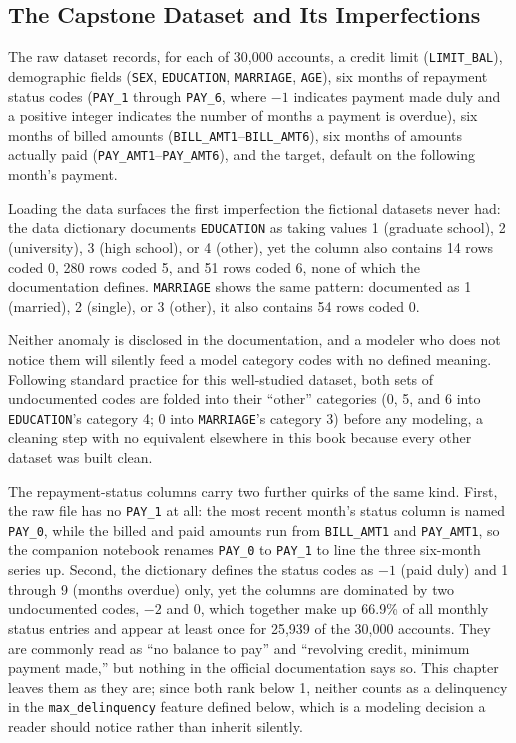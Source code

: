 \documentclass[../ai_in_finance]{subfiles}
\begin{document}
\subsection{The Capstone Dataset and Its Imperfections}
\label{sec:capstone-data}

The raw dataset records, for each of 30,000 accounts, a credit limit (\texttt{LIMIT\_BAL}), demographic fields (\texttt{SEX}, \texttt{EDUCATION}, \texttt{MARRIAGE}, \texttt{AGE}), six months of repayment status codes (\texttt{PAY\_1} through \texttt{PAY\_6}, where $-1$ indicates payment made duly and a positive integer indicates the number of months a payment is overdue), six months of billed amounts (\texttt{BILL\_AMT1}--\texttt{BILL\_AMT6}), six months of amounts actually paid (\texttt{PAY\_AMT1}--\texttt{PAY\_AMT6}), and the target, default on the following month's payment.

Loading the data surfaces the first imperfection the fictional datasets never had: the data dictionary documents \texttt{EDUCATION} as taking values 1 (graduate school), 2 (university), 3 (high school), or 4 (other), yet the column also contains 14 rows coded 0, 280 rows coded 5, and 51 rows coded 6, none of which the documentation defines. \texttt{MARRIAGE} shows the same pattern: documented as 1 (married), 2 (single), or 3 (other), it also contains 54 rows coded 0.

Neither anomaly is disclosed in the documentation, and a modeler who does not notice them will silently feed a model category codes with no defined meaning. Following standard practice for this well-studied dataset, both sets of undocumented codes are folded into their ``other'' categories (0, 5, and 6 into \texttt{EDUCATION}'s category 4; 0 into \texttt{MARRIAGE}'s category 3) before any modeling, a cleaning step with no equivalent elsewhere in this book because every other dataset was built clean.

The repayment-status columns carry two further quirks of the same kind. First, the raw file has no \texttt{PAY\_1} at all: the most recent month's status column is named \texttt{PAY\_0}, while the billed and paid amounts run from \texttt{BILL\_AMT1} and \texttt{PAY\_AMT1}, so the companion notebook renames \texttt{PAY\_0} to \texttt{PAY\_1} to line the three six-month series up. Second, the dictionary defines the status codes as $-1$ (paid duly) and 1 through 9 (months overdue) only, yet the columns are dominated by two undocumented codes, $-2$ and $0$, which together make up 66.9\% of all monthly status entries and appear at least once for 25{,}939 of the 30{,}000 accounts. They are commonly read as ``no balance to pay'' and ``revolving credit, minimum payment made,'' but nothing in the official documentation says so. This chapter leaves them as they are; since both rank below 1, neither counts as a delinquency in the \texttt{max\_\allowbreak delinquency} feature defined below, which is a modeling decision a reader should notice rather than inherit silently.
\end{document}
